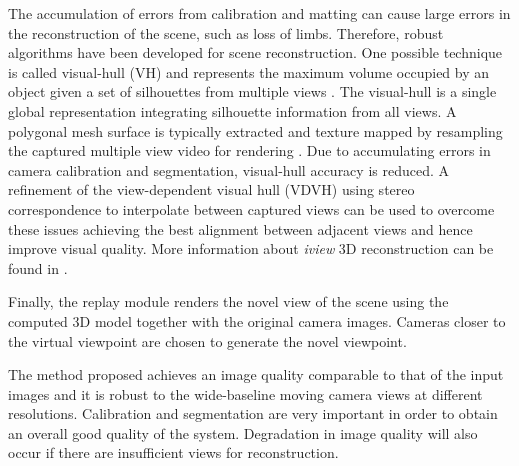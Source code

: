 The accumulation of errors from calibration and matting can cause large errors in
the reconstruction of the scene, such as loss of limbs. 
Therefore, robust algorithms have been developed for scene reconstruction.
One possible technique is called visual-hull (VH) and represents the maximum volume occupied by an object
given a set of silhouettes from multiple views \cite{2.2_iview_08}.
The visual-hull is a single global representation integrating silhouette information from all
views. A polygonal mesh surface is typically extracted and texture mapped by resampling
the captured multiple view video for rendering \cite{2.2_iview}.
Due to accumulating errors in camera calibration and segmentation, visual-hull accuracy is reduced.
A refinement of the view-dependent visual hull (VDVH) \cite{2.1_iview_12}
using stereo correspondence to interpolate between captured
views can be used to overcome these issues achieving the best alignment between adjacent views and 
hence improve visual quality.
More information about \textit{iview} 3D reconstruction can be found in \cite{02_iview,2.1_iview,2.2_iview}.

Finally, the replay module renders the novel view of the scene using the computed 3D model together with the
original camera images.
Cameras closer to the virtual viewpoint are chosen to generate the novel viewpoint.


The method proposed achieves an image quality comparable to that of the input images and it is robust to the
wide-baseline moving camera views at different resolutions.
Calibration and segmentation are very important in order to obtain an overall good quality of the system.
Degradation in image quality will also occur if there are insufficient views for reconstruction.







